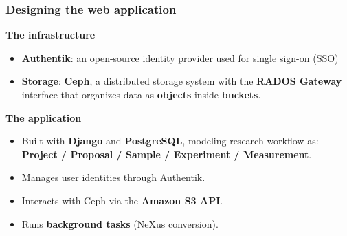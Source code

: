 \documentclass{beamer}
\begin{document}
\begin{frame}
	\end{frame}
	
	\begin{frame}
		\frametitle{Designing the web application}
		
		\textbf{The infrastructure}
		\begin{itemize}
			\item \textbf{Authentik}: an open-source identity provider used for single sign-on (SSO)
			\item \textbf{Storage}: \textbf{Ceph}, a distributed storage system with the \textbf{RADOS Gateway} interface that organizes data as \textbf{objects} inside \textbf{buckets}.
		\end{itemize}
		
		\vspace{0.8em}
		
		\textbf{The application}
		\begin{itemize}
			\item Built with \textbf{Django} and \textbf{PostgreSQL}, modeling research workflow as:
			\textbf{Project / Proposal / Sample / Experiment / Measurement}.
			\item Manages user identities through Authentik.
			\item Interacts with Ceph via the \textbf{Amazon S3 API}.
			\item Runs \textbf{background tasks} (NeXus conversion).
		\end{itemize}
	\end{frame}
	
\end{document}
